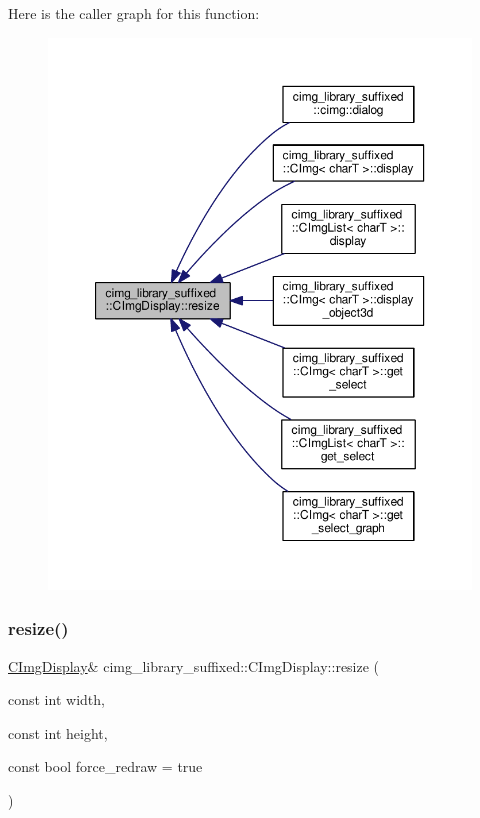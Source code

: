 Here is the caller graph for this function\+:
\nopagebreak
\begin{figure}[H]
\begin{center}
\leavevmode
\includegraphics[width=350pt]{d5/d53/structcimg__library__suffixed_1_1CImgDisplay_a35a57d0053db927961c5d3a12918055a_icgraph}
\end{center}
\end{figure}
\mbox{\label{structcimg__library__suffixed_1_1CImgDisplay_addf4e29782b6cb1273b880743d639c0c}} 
\subsubsection{\texorpdfstring{resize()}{resize()}\hspace{0.1cm}{\footnotesize\ttfamily [2/4]}}
{\footnotesize\ttfamily \hyperlink{structcimg__library__suffixed_1_1CImgDisplay}{C\+Img\+Display}\& cimg\+\_\+library\+\_\+suffixed\+::\+C\+Img\+Display\+::resize (\begin{DoxyParamCaption}\item[{const int}]{width,  }\item[{const int}]{height,  }\item[{const bool}]{force\+\_\+redraw = {\ttfamily true} }\end{DoxyParamCaption})\hspace{0.3cm}{\ttfamily [inline]}}



